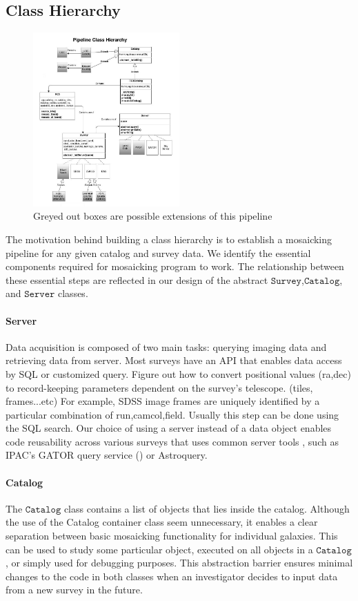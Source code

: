 \documentclass[5p]{elsarticle}
\begin{document}
	\subsection{Class Hierarchy}
	\begin{figure}[h]
		\includegraphics[width=0.5\textwidth]{pipeline}
		\caption{Greyed out boxes are possible extensions of this pipeline}
	\end{figure}
 	The motivation behind building a class hierarchy is to establish a mosaicking pipeline for any given catalog and survey data. We identify the essential components required for mosaicking program to work. The relationship between these essential steps are reflected in our design of the abstract $\texttt{Survey}$,$\texttt{Catalog}$, and $\texttt{Server}$ classes. 
 		\paragraph{Server}
		Data acquisition is composed of two main tasks: querying imaging data and retrieving data from server. Most surveys have an API that enables data access by SQL or customized query. Figure out how to convert positional values (ra,dec) to record-keeping parameters dependent on the survey's telescope. (tiles, frames...etc) For example, SDSS image frames are uniquely identified by a particular combination of  run,camcol,field.  Usually this step can be done using the SQL search. Our choice of using a server instead of a data object enables code reusability across various surveys that uses common server tools , such as IPAC's GATOR query service (\citet{irsa}) or  Astroquery.
	\paragraph{Catalog}
	The $\texttt{Catalog}$ class contains a list of objects that lies inside the catalog. Although the use of the Catalog container class seem unnecessary, it enables a clear separation between basic mosaicking functionality for individual galaxies. This can be used to study some particular object, executed on all objects in a $\texttt{Catalog}$, or simply used for debugging purposes. This abstraction barrier ensures minimal changes to the code in both classes when an investigator decides to input data from a new survey in the future.
\end{document}
